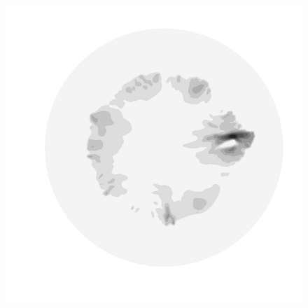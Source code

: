 \begin{figure}
\begin{minipage}[b]{0.30\linewidth}
  \end{minipage}
  \quad
  \begin{minipage}[b]{0.30\linewidth}
    \includegraphics[width=1.0\textwidth]{images/EISMINT_II/Ubar/U_mag_5000.jpg}
  \end{minipage}
  

\end{figure}
